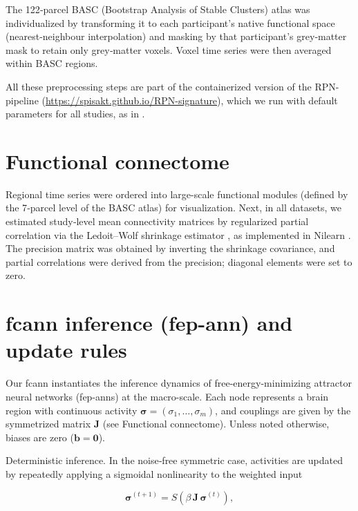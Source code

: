 \documentclass{article}
\begin{document}
The 122‑parcel BASC (Bootstrap Analysis of Stable Clusters) atlas \citep{bellec2010multi} was individualized by transforming it to each participant's native functional space (nearest‑neighbour interpolation) and masking by that participant's grey‑matter mask to retain only grey‑matter voxels. Voxel time series were then averaged within BASC regions.

All these preprocessing steps are part of the containerized version of the RPN-pipeline (\href{https://spisakt.github.io/RPN-signature}{https://spisakt.github.io/RPN-signature}), which we run with default parameters for all studies, as in \cite{Spisak2020Pain}.

\section{Functional connectome}

Regional time series were ordered into large-scale functional modules (defined by the 7‑parcel level of the BASC atlas) for visualization.
Next, in all datasets, we estimated study‑level mean connectivity matrices by regularized partial correlation via the Ledoit--Wolf shrinkage estimator \citep{Ledoit_2004}, as implemented in Nilearn \citep{abraham2014machine}. The precision matrix was obtained by inverting the shrinkage covariance, and partial correlations were derived from the precision; diagonal elements were set to zero.

\section{\acrshort{fcann} inference (\acrshort{fep-ann}) and update rules}

Our \acrshort{fcann} instantiates the inference dynamics of free-energy-minimizing attractor neural networks (\acrshort{fep-ann}s) at the macro-scale. Each node represents a brain region with continuous activity $\boldsymbol{\sigma} = (\sigma_1,\dots,\sigma_m)$, and couplings are given by the symmetrized matrix $\boldsymbol{J}$ (see Functional connectome). Unless noted otherwise, biases are zero ($\boldsymbol{b}=\boldsymbol{0}$).

Deterministic inference. In the noise‑free symmetric case, activities are updated by repeate\acrshort{dl}y applying a sigmoidal nonlinearity to the weighted input

\begin{equation}
\label{fep-deterministic-update}
\boldsymbol{\sigma}^{(t+1)} = S\!\left( \beta\, \boldsymbol{J}\, \boldsymbol{\sigma}^{(t)} \right),
\end{equation}
\end{document}
